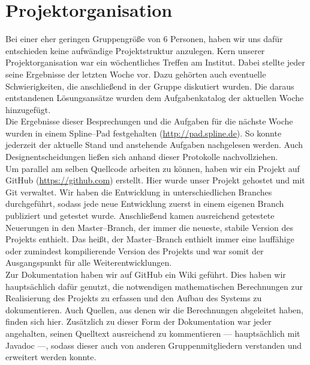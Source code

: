 \section{Projektorganisation}
    
Bei einer eher geringen Gruppengröße von 6 Personen, haben wir uns dafür entschieden keine aufwändige Projektstruktur anzulegen. Kern unserer Projektorganisation war ein wöchentliches Treffen am Institut. Dabei stellte jeder seine Ergebnisse der letzten Woche vor. Dazu gehörten auch eventuelle Schwierigkeiten, die anschließend in der Gruppe diskutiert wurden. Die daraus entstandenen Lösungsansätze wurden dem Aufgabenkatalog der aktuellen Woche hinzugefügt.\\
Die Ergebnisse dieser Besprechungen und die Aufgaben für die nächste Woche wurden in einem Spline--Pad festgehalten (\url{http://pad.spline.de}). So konnte jederzeit der aktuelle Stand und anstehende Aufgaben nachgelesen werden. Auch Designentscheidungen ließen sich anhand dieser Protokolle nachvollziehen.\\
Um parallel am selben Quellcode arbeiten zu können, haben wir ein Projekt auf GitHub (\url{https://github.com}) erstellt. Hier wurde unser Projekt gehostet und mit Git verwaltet. Wir haben die Entwicklung in unterschiedlichen Branches durchgeführt, sodass jede neue Entwicklung zuerst in einem eigenen Branch publiziert und getestet wurde. Anschließend kamen ausreichend getestete Neuerungen in den Master--Branch, der immer die neueste, stabile Version des Projekts enthielt. Das heißt, der Master--Branch enthielt immer eine lauffähige oder zumindest kompilierende Version des Projekts und war somit der Ausgangspunkt für alle Weiterentwicklungen.\\
Zur Dokumentation haben wir auf GitHub ein Wiki geführt. Dies haben wir hauptsächlich dafür genutzt, die notwendigen mathematischen Berechnungen zur Realisierung des Projekts zu erfassen und den Aufbau des Systems zu dokumentieren. Auch Quellen, aus denen wir die Berechnungen abgeleitet haben, finden sich hier. Zusätzlich zu dieser Form der Dokumentation war jeder angehalten, seinen Quelltext ausreichend zu kommentieren --- hauptsächlich mit Javadoc ---, sodass dieser auch von anderen Gruppenmitgliedern verstanden und erweitert werden konnte.\\
